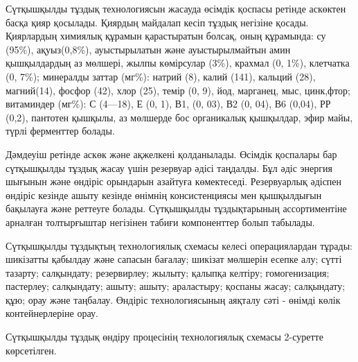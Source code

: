 Сүтқышқылды тұздық технологиясын жасауда өсімдік қоспасы ретінде
аскөктен басқа қияр қосылады. Қиярдың майдалап кесіп тұздық негізіне
қосады. Қиярлардың химиялық құрамын қарастыратын болсақ, оның құрамында:
су (95\%), ақуыз(0,8\%), ауыстырылатын және ауыстырылмайтын амин
қышқылдардың аз мөлшері, жылпы көмірсулар (3\%), крахмал (0, 1\%),
клетчатка (0, 7\%); минералды заттар (мг\%): натрий (8), калий (141),
кальций (28), магний(14), фосфор (42), хлор (25), темір (0, 9), йод,
марганец, мыс, цинк,фтор; витаминдер (мг\%): С (4---18), Е (0, 1), В1,
(0, 03), В2 (0, 04), В6 (0,04), РР (0,2), пантотен қышқылы, аз мөлшерде
бос органикалық қышқылдар, эфир майы, түрлі ферменттер болады.

Дәмдеуіш ретінде аскөк және ақжелкені қолданылады. Өсімдік қоспалары бар
сүтқышқылды тұздық жасау үшін резервуар әдісі таңдалды. Бұл әдіс энергия
шығынын және өндіріс орындарын азайтуға көмектеседі. Резервуарлық
әдіспен өндіріс кезінде ашыту кезінде өнімнің консистенциясы мен
қышқылдығын бақылауға және реттеуге болады. Сүтқышқылды тұздықтарының
ассортиментіне арналған толтырғыштар негізінен табиғи компоненттер болып
табылады.

Сүтқышқылды тұздықтың технологиялық схемасы келесі операциялардан
тұрады: шикізатты қабылдау және сапасын бағалау; шикізат мөлшерін есепке
алу; сүтті тазарту; салқындату; резервирлеу; жылыту; қалыпқа келтіру;
гомогенизация; пастерлеу; салқындату; ашыту; ашыту; араластыру; қоспаны
жасау; салқындату; құю; орау және таңбалау. Өндіріс технологиясының
аяқталу сәті - өнімді көлік контейнерлеріне орау.

Сүтқышқылды тұздық өндіру процесінің технологиялық схемасы 2-суретте
көрсетілген.

